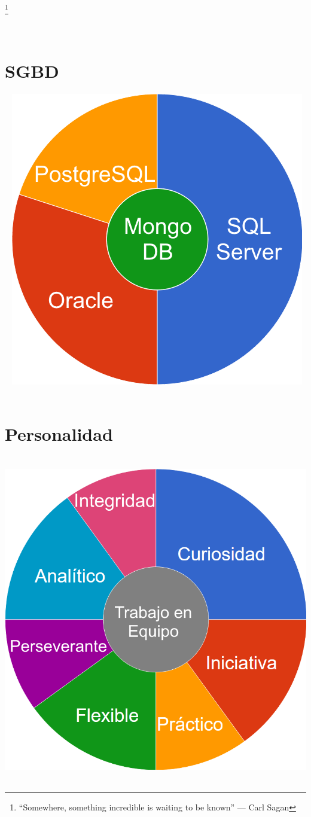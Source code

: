 \documentclass[]{friggeri-cv}
\begin{document}
\let\thefootnote\relax\footnote{\enquote{Somewhere, something incredible is waiting to be known} --- Carl Sagan}

\newpage

\begin{aside}
~
~
~
  \section{SGBD}
  ~
    \includegraphics[scale=0.30]{img/Skill_BD.png}
    ~
  \section{Personalidad}
  ~
    \includegraphics[scale=0.19]{img/Skill_Personal.png}
    ~

\end{aside}
\end{document}
